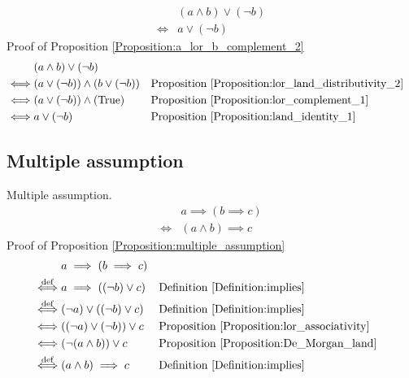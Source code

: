 \begin{prop}
\label{Proposition:a_lor_b_complement_2}
\begin{align*}
& (a \land b) \lor (\lnot b) \\
\iff & a \lor (\lnot b)
\end{align*}
Proof of Proposition \ref{Proposition:a_lor_b_complement_2}
\begin{align*}
& (a \land b) \lor (\lnot b) \\
\iff & (a \lor (\lnot b)) \land (b \lor (\lnot b))
& & \text{Proposition \ref{Proposition:lor_land_distributivity_2}} \\
\iff & (a \lor (\lnot b)) \land (\text{True})
& & \text{Proposition \ref{Proposition:lor_complement_1}} \\
\iff & a \lor (\lnot b)
& & \text{Proposition \ref{Proposition:land_identity_1}} \\
\end{align*}
\end{prop}

\subsection{Multiple assumption}
\begin{prop}
\label{Proposition:multiple_assumption}
Multiple assumption.
\begin{align*}
& a \implies (b \implies c) \\
\iff & (a \land b) \implies c
\end{align*}
Proof of Proposition \ref{Proposition:multiple_assumption}
\begin{align*}
& a \implies (b \implies c) \\
\overset{\operatorname{def}}{\iff} & a \implies ((\lnot b) \lor c)
& & \text{Definition \ref{Definition:implies}} \\
\overset{\operatorname{def}}{\iff} & (\lnot a) \lor ((\lnot b) \lor c)
& & \text{Definition \ref{Definition:implies}} \\
\iff & ((\lnot a) \lor (\lnot b)) \lor c
& & \text{Proposition \ref{Proposition:lor_associativity}} \\
\iff & (\lnot (a \land b)) \lor c
& & \text{Proposition \ref{Proposition:De_Morgan_land}} \\
\overset{\operatorname{def}}{\iff} & (a \land b) \implies c
& & \text{Definition \ref{Definition:implies}} \\
\end{align*}
\end{prop}


